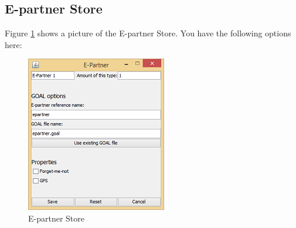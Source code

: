 \documentclass[11pt,a4paper]{article}
\begin{document}
\subsection{E-partner Store}
Figure \ref{fig:EPartnerStore} shows a picture of the E-partner Store. You have the following options here:

\begin{figure}[h]
\begin{center}
\includegraphics{es.png}
\end{center}
\caption{E-partner Store}\label{fig:EPartnerStore}
\end{figure}
\end{document}
